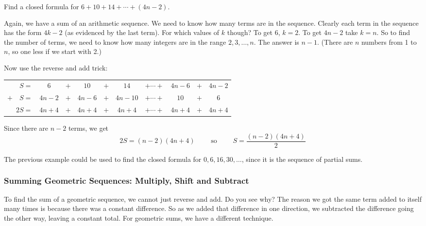\documentclass[12pt]{article}
\begin{document}
\begin{example} 
  Find a closed formula for $6 + 10 + 14 + \cdots + (4n - 2)$.
  \begin{solution}
    Again, we have a sum of an arithmetic sequence.  We need to know how many terms are in the sequence.  Clearly each term in the sequence has the form $4k -2$ (as evidenced by the last term).  For which values of $k$ though?  To get 6, $k = 2$.  To get $4n-2$ take $k = n$.  So to find the number of terms, we need to know how many integers are in the range $2,3,\ldots, n$.  The answer is $n-1$.  (There are $n$ numbers from 1 to $n$, so one less if we start with 2.)
    
    Now use the reverse and add trick:
    
        \begin{center}
    \begin{tabular}{rccccccccc}
      $S  =  $& $6 $&$ + $& $10$ & $ + $ & $14$ & $+ \cdots + $ & $4n-6$ &$ + $ & $4n-2$ \\
     $+ \quad S  = $& $4n-2$ & $+ $ & $4n-6$ & $ + $ & $4n-10$& $+ \cdots + $& $10$ & $+$ & 6 \\ \hline
     $2S  = $& $4n+4$ & $+ $ & $4n+4$ & $ + $ & $4n+4$& $+ \cdots + $&$4n+4$ & $+$ & $4n+4$ \\
    \end{tabular}
    \end{center}
    
    Since there are $n-2$ terms, we get
    \[2S = (n-2)(4n+4)\qquad \mbox{ so }\qquad S = \frac{(n-2)(4n+4)}{2}\]
  \end{solution}

\end{example}

The previous example could be used to find the closed formula for $0, 6, 16, 30, \ldots$, since it is the sequence of partial sums.


\subsubsection*{Summing Geometric Sequences: Multiply, Shift and Subtract}

To find the sum of a geometric sequence, we cannot just reverse and add.  Do you see why?  The reason we got the same term added to itself many times is because there was a constant difference.  So as we added that difference in one direction, we subtracted the difference going the other way, leaving a constant total.  For geometric sums, we have a different technique.
\end{document}
